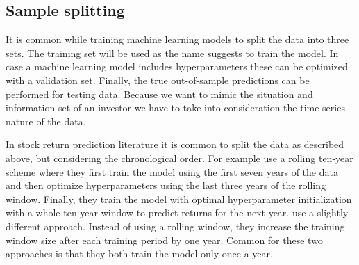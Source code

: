 \documentclass[12pt]{article}
\begin{document}
\subsection{Sample splitting} \label{SampleSplitting}

It is common while training machine learning models to split the data into three sets. The training set will be used as the name suggests to train the model. In case a machine learning model includes hyperparameters these can be optimized with a validation set. Finally, the true out-of-sample predictions can be performed for testing data. Because we want to mimic the situation and information set of an investor we have to take into consideration the time series nature of the data. \par

In stock return prediction literature it is common to split the data as described above, but considering the chronological order. For example \citet{Fieberg} use a rolling ten-year scheme where they first train the model using the first seven years of the data and then optimize hyperparameters using the last three years of the rolling window. Finally, they train the model with optimal hyperparameter initialization with a whole ten-year window to predict returns for the next year. \citet{guetal} use a slightly different approach. Instead of using a rolling window, they increase the training window size after each training period by one year. Common for these two approaches is that they both train the model only once a year. \par
\end{document}
